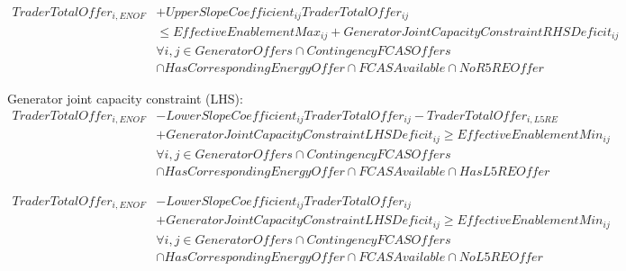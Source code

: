\documentclass{article}
\begin{document}
\begin{equation}
\begin{split}
TraderTotalOffer_{i,ENOF} & + UpperSlopeCoefficient_{ij} TraderTotalOffer_{ij}\\
& \leq EffectiveEnablementMax_{ij} + GeneratorJointCapacityConstraintRHSDeficit_{ij}\\
& \forall i,j \in GeneratorOffers \cap ContingencyFCASOffers \\
& \cap HasCorrespondingEnergyOffer \cap FCASAvailable \cap NoR5REOffer
\end{split}
\end{equation}

%
%
%
%
%

Generator joint  capacity constraint (LHS):
\begin{equation}
\begin{split}
TraderTotalOffer_{i,ENOF} & - LowerSlopeCoefficient_{ij} TraderTotalOffer_{ij} - TraderTotalOffer_{i,L5RE}\\
& + GeneratorJointCapacityConstraintLHSDeficit_{ij} \geq EffectiveEnablementMin_{ij} \\
& \forall i,j \in GeneratorOffers \cap ContingencyFCASOffers \\
& \cap HasCorrespondingEnergyOffer \cap FCASAvailable \cap HasL5REOffer
\end{split}
\end{equation}

\begin{equation}
\begin{split}
TraderTotalOffer_{i,ENOF} & - LowerSlopeCoefficient_{ij} TraderTotalOffer_{ij}\\
& + GeneratorJointCapacityConstraintLHSDeficit_{ij} \geq EffectiveEnablementMin_{ij} \\
& \forall i,j \in GeneratorOffers \cap ContingencyFCASOffers \\
& \cap HasCorrespondingEnergyOffer \cap FCASAvailable \cap NoL5REOffer
\end{split}
\end{equation}
\end{document}
